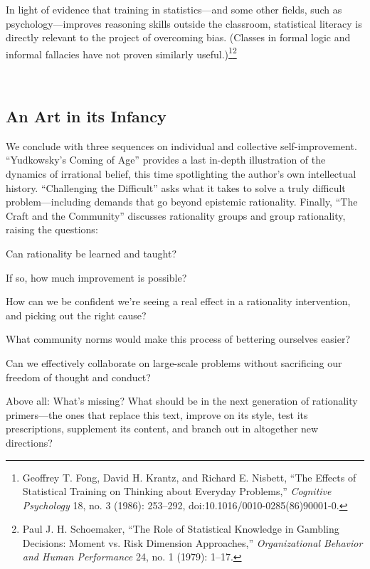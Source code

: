 {
 In light of evidence that training in statistics---and some other
fields, such as psychology---improves reasoning skills outside the
classroom, statistical literacy is directly relevant to the project of
overcoming bias. (Classes in formal logic and informal fallacies have
not proven similarly useful.)\footnote{Geoffrey T. Fong, David H. Krantz, and Richard E. Nisbett,
``The Effects of Statistical Training on Thinking
about Everyday Problems,'' \textit{Cognitive
Psychology} 18, no. 3 (1986): 253--292,
doi:10.1016/0010-0285(86)90001-0.}\supercomma\footnote{Paul J. H. Schoemaker, ``The Role of
Statistical Knowledge in Gambling Decisions: Moment vs. Risk Dimension
Approaches,'' \textit{Organizational Behavior and
Human Performance} 24, no. 1 (1979): 1--17.}}

{
 ~}

\subsection{An Art in its Infancy}

{
 We conclude with three sequences on individual and collective
self-improvement. ``Yudkowsky's Coming
of Age'' provides a last in-depth illustration of the
dynamics of irrational belief, this time spotlighting the
author's own intellectual history.
``Challenging the Difficult'' asks
what it takes to solve a truly difficult problem---including demands
that go beyond epistemic rationality. Finally, ``The
Craft and the Community'' discusses rationality
groups and group rationality, raising the questions:}

{
 Can rationality be learned and taught?}

{
 If so, how much improvement is possible?}

{
 How can we be confident we're seeing a real effect
in a rationality intervention, and picking out the right cause?}

{
 What community norms would make this process of bettering
ourselves easier?}

{
 Can we effectively collaborate on large-scale problems without
sacrificing our freedom of thought and conduct?}

{
 Above all: What's missing? What should be in the
next generation of rationality primers---the ones that replace this
text, improve on its style, test its prescriptions, supplement its
content, and branch out in altogether new directions?}

